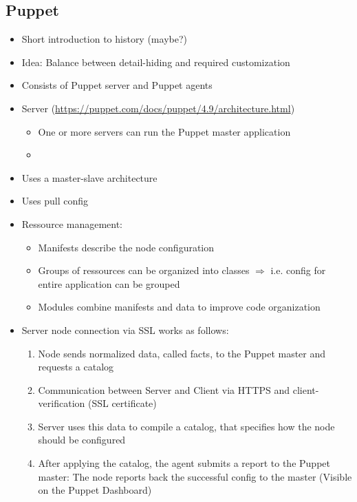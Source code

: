 \subsection{Puppet}

	\begin{itemize}
		\item Short introduction to history (maybe?)
		\item Idea: Balance between detail-hiding and required customization
	\end{itemize}

	\begin{itemize}
		\item Consists of Puppet server and Puppet agents
		\item Server (\url{https://puppet.com/docs/puppet/4.9/architecture.html})
		\begin{itemize}
			\item One or more servers can run the Puppet master application
			\item 
		\end{itemize}
		\item Uses a master-slave architecture
		\item Uses pull config
		\item Ressource management:
		\begin{itemize}
			\item Manifests describe the node configuration
			\item Groups of ressources can be organized into classes $\Rightarrow$ i.e. config for entire application can be grouped
			\item Modules combine manifests and data to improve code organization
		\end{itemize}
		\item Server node connection via SSL works as follows:
		\begin{enumerate}
			\item Node sends normalized data, called facts, to the Puppet master and requests a catalog
			\item Communication between Server and Client via HTTPS and client-verification (SSL certificate)
			\item Server uses this data to compile a catalog, that specifies how the node should be configured
			\item After applying the catalog, the agent submits a report to the Puppet master: The node reports back the successful config to the master (Visible on the Puppet Dashboard)
		\end{enumerate}

\end{itemize}
